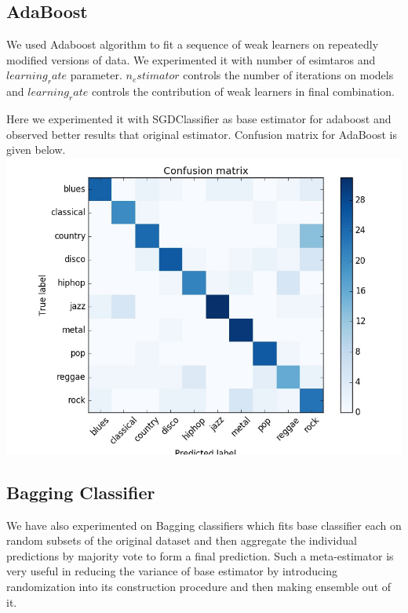 \documentclass[conference]{IEEEtran}
\begin{document}
\subsection{AdaBoost}
\label{sub:AdaBoost Classification}
We used Adaboost algorithm to fit a sequence of weak learners on repeatedly modified versions of data. We experimented it with number of esimtaros and $learning_rate$ parameter. $n_estimator$ controls the number of iterations on models and $learning_rate$ controls the contribution of weak learners in final combination.

Here we experimented it with SGDClassifier as base estimator for adaboost and observed better results that original estimator.
Confusion matrix for AdaBoost is given below.
\includegraphics[width=\columnwidth]{ADABOOST}

\subsection{Bagging Classifier}
\label{sub:Baagging Classification}
We have also experimented on Bagging classifiers which fits base classifier each on random subsets of the original dataset and then aggregate the individual predictions by majority vote to form a final prediction. Such a meta-estimator is very useful in reducing the variance of base estimator by introducing randomization into its construction procedure and then making ensemble out of it.
\end{document}
